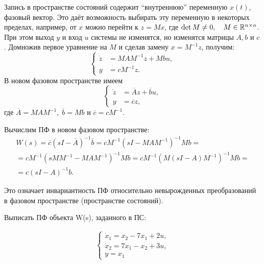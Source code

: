 \documentclass[../../TAU.tex]{subfiles}
\begin{document}
    Запись в пространстве состояний содержит ``внутреннюю'' переменную $x(t)$, фазовый вектор. Это даёт возможность выбирать эту переменную в некоторых пределах, например, от $x$ можно перейти к ${z=Mx}$, где 
    $\det M \neq 0,\quad M\in\mathbb{R}^{n\times n}$. 
    При этом выход $y$ и вход $u$ системы не изменятся, но изменятся матрицы $A, b$ и $c$. Домножив первое уравнение на $M$ и сделав замену 
    ${x=M^{-1}z}$, 
    получим:
    $$
        \left\{
        \begin{aligned}
            \dot z &=M AM^{-1}z+Mbu,\\
            y&= cM^{-1}z.
        \end{aligned}
        \right.
    $$
    В новом фазовом пространстве имеем
    $$
        \left\{
        \begin{aligned}
            \dot z &= \overline{A}z+\overline{b}u,\\
            y&= \overline{c}z,
        \end{aligned}
        \right.
    $$
    где 
    ${\overline{A} = M AM^{-1},\; \overline{b} = Mb}$ 
    и 
    ${\overline{c}= cM^{-1}}$.

    Вычислим ПФ в новом фазовом пространстве:
    \begin{multline*}
        W(s) = \overline{c}(sI-\overline{A})^{-1}\overline{b} = cM^{-1}(sI-MAM^{-1})^{-1}Mb = \\
        = c M^{-1} (sMM^{-1} - MAM^{-1})^{-1}Mb = c M^{-1}(M(sI-A)M^{-1})^{-1}Mb = \\
        =c(sI-A)^{-1}b.
    \end{multline*}

    Это означает инвариантность ПФ относительно невырожденных преобразований в фазовом пространстве (пространстве состояний).
    \pagebreak

    \examp
    {
        Выписать ПФ объекта W(s), заданного в ПС:

        \begin{align*}
            \begin{cases}
                \dot x_1=x_2-7x_1+2u, \\
                \dot x_2=7x_1-x_2+3u, \\
                y = x_1
            \end{cases}
        \end{align*}
    }
\end{document}
